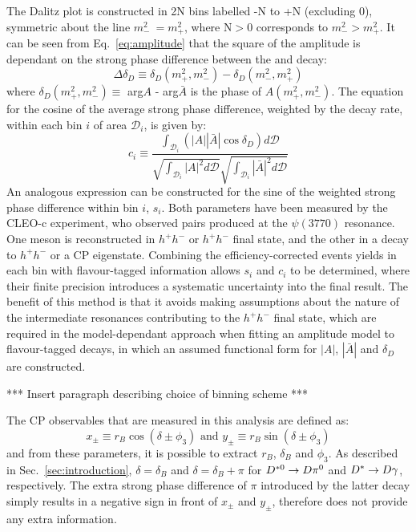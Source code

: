   The Dalitz plot is constructed in 2N bins labelled -N to +N (excluding 0), symmetric about the line $m_-^2\ =  m_+^2$, where N$>0$ corresponds to $m_-^2 > m_+^2$. It can be seen from Eq.~\ref{eq:amplitude} that the square of the amplitude is dependant on the strong phase difference between the \Dz and \Dzb decay:
    \begin{equation}
      \Delta\delta_D \equiv \delta_D(m_+^2,m_-^2) - \delta_D(m_-^2,m_+^2)
    \end{equation}
    where $\delta_D(m_+^2,m_-^2) \equiv$ arg$A$ - arg$\bar{A}$ is the phase of $A(m_+^2,m_-^2)$. The equation for the cosine of the average strong phase difference, weighted by the decay rate, within each bin $i$ of area $\mathcal{D}_i$, is given by:
    \begin{equation}
      c_i \equiv \frac{\int_{\mathcal{D}_i} ( | A | | \bar{A} | \cos{\delta_D}) d\mathcal{D}}{\sqrt{\int_{\mathcal{D}_i} | A |^2 d\mathcal{D}} {\sqrt{\int_{\mathcal{D}_i} | \bar{A} |^2 d\mathcal{D}}}}
    \end{equation}
An analogous expression can be constructed for the sine of the weighted strong phase difference within bin $i$, $s_i$. Both parameters have been measured by the CLEO-c experiment, who observed \Dz\Dzb pairs produced at the $\psi(3770)$ resonance. One \D meson is reconstructed in \KS$h^+h^-$ or \KL$h^+h^-$ final state, and the other in a decay to \KS$h^+h^-$ or a CP eigenstate. Combining the efficiency-corrected events yields in each bin with flavour-tagged information
allows $s_i$ and $c_i$ to
be determined, where their finite precision introduces a systematic uncertainty into the final result. The benefit of this method is that it avoids making assumptions about the nature
    of the intermediate resonances contributing to the \KS$h^+h^-$ final state, which are required in the model-dependant approach when fitting an amplitude model to flavour-tagged \Dz decays, in which an assumed functional form for $|A|$, $|\bar{A}|$ and $\delta_D$ are constructed.

\begin{center}
  *** Insert paragraph describing choice of binning scheme ***
\end{center}
The CP observables that are measured in this analysis are defined as:
\begin{equation}
  x_{\pm} \equiv r_B\cos{(\delta \pm \phi_3)} \text{ and } y_{\pm} \equiv r_B\sin{(\delta \pm \phi_3)}
\end{equation}
and from these parameters, it is possible to extract $r_B$, $\delta_B$ and $\phi_3$. As described in Sec.~\ref{sec:introduction}, $\delta=\delta_B$ and $\delta=\delta_B+\pi$ for ${{D}^{*0}}\rightarrow {\ensuremath{D}} {\ensuremath{{\pi}^0}}$ and ${{D}^*}\rightarrow {\ensuremath{D}} \gamma$, respectively. The extra strong phase difference of $\pi$ introduced by the latter decay simply results in a negative sign in front of $x_{\pm}$ and $y_{\pm}$, therefore does not provide any extra information.

